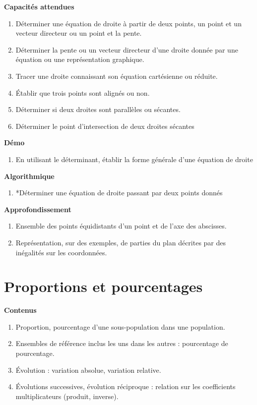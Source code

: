 \documentclass[10pt,a4paper]{article}
\begin{document}
\textbf{Capacités attendues}
 
\begin{enumerate}
\item  Déterminer une équation de droite à partir de deux points, un point et un vecteur 
directeur ou un point et la pente.
\item  Déterminer la pente ou un vecteur directeur d’une droite donnée par une équation ou 
une représentation graphique.
\item  Tracer une droite connaissant son équation cartésienne ou réduite.
\item  Établir que trois points sont alignés ou non.
\item  Déterminer si deux droites sont parallèles ou sécantes.
\item  Déterminer le point d'intersection de deux droites sécantes
\end{enumerate}

\textbf{Démo}

\begin{enumerate}
\item  En utilisant le déterminant, établir la forme générale d'une équation de droite
\end{enumerate}

\textbf{Algorithmique}

\begin{enumerate}
\item *Déterminer une équation de droite passant par deux points donnés
\end{enumerate}

\textbf{Approfondissement}

\begin{enumerate}
\item Ensemble des points équidistants d'un point et de l'axe des abscisses.
\item Représentation, sur des exemples, de parties du plan décrites par des inégalités sur les coordonnées.
\end{enumerate}


\section{Proportions et pourcentages}

\textbf{Contenus}

\begin{enumerate}
\item Proportion, pourcentage d’une sous-population dans une population.
\item  Ensembles de référence inclus les uns dans les autres : pourcentage de 
pourcentage.
\item  Évolution : variation absolue, variation relative.
\item  Évolutions successives, évolution réciproque : relation sur les coefficients 
multiplicateurs (produit, inverse).
\end{enumerate}
\end{document}
